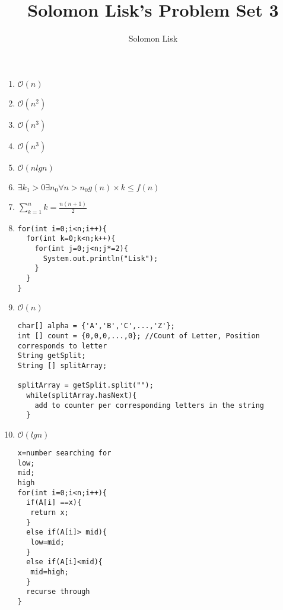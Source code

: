 \documentclass{article}
\title{Solomon Lisk's Problem Set 3}
\author{Solomon Lisk}
\begin{document}
\maketitle

\begin{enumerate}
\item $\mathcal{O}(n)$
\item $\mathcal{O}(n^2)$
\item $\mathcal{O}(n^3)$
\item $\mathcal{O}(n^3)$
\item $\mathcal{O}(nlgn)$
\item $\exists k_1>0\exists n_0 \forall n > n_0g(n) \times k \leq f(n) $
\item $ \sum_{k=1}^{n} k=\frac{n(n+1)}{2}$
\item \begin{lstlisting}
for(int i=0;i<n;i++){
  for(int k=0;k<n;k++){
	for(int j=0;j<n;j*=2){
	  System.out.println("Lisk");
    }
  }
}
\end{lstlisting}
\item $\mathcal{O}(n)$ 
\begin {lstlisting}
char[] alpha = {'A','B','C',...,'Z'}; 
int [] count = {0,0,0,...,0}; //Count of Letter, Position corresponds to letter
String getSplit;
String [] splitArray;

splitArray = getSplit.split("");
  while(splitArray.hasNext){
    add to counter per corresponding letters in the string
  }
\end{lstlisting}
\item $\mathcal{O}(lgn)$
\begin{lstlisting}
x=number searching for
low;
mid;
high
for(int i=0;i<n;i++){
  if(A[i] ==x){
   return x; 
  }
  else if(A[i]> mid){
   low=mid;
  }
  else if(A[i]<mid){
   mid=high;
  }
  recurse through
}
\end{lstlisting}
\end{enumerate}
\end{document}
